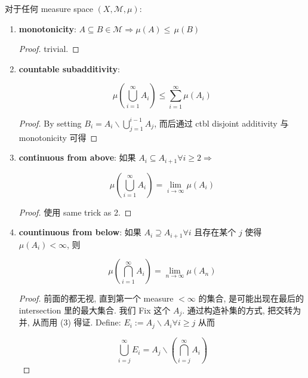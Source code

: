 \begin{theorem}{}

对于任何 measure space \((X,\mathcal{M},\mu)\):

\begin{enumerate}
\item
  \textbf{monotonicity}: \(A \subseteq B \in \mathcal{M}\Longrightarrow\mu(A) \leq \,\mu(B)\)

  \begin{proof}

  trivial.

  \end{proof}
\item
  \textbf{countable subadditivity}:

  \[\mu(\bigcup\limits_{i = 1}^{\infty}A_{i}) \leq \sum\limits_{i = 1}^{\infty}\mu(A_{i})\]

  \begin{proof}

  By setting \(B_{i} = A_{i}\backslash\bigcup_{j = 1}^{i - 1}A_{j}\), 而后通过 ctbl disjoint additivity 与 monotonicity 可得

  \end{proof}
\item
  \textbf{continuous from above}: 如果 \(A_{i} \subseteq A_{i + 1}\forall i \geq 2\Longrightarrow\)

  \[\mu(\bigcup\limits_{i = 1}^{\infty}A_{i}) = \lim\limits_{i\rightarrow\infty}\mu(A_{i})\]

  \begin{proof}

  使用 same trick as 2.

  \end{proof}
\item
  \textbf{countinuous from below}: 如果 \(A_{i} \supseteq A_{i + 1}\forall i\) 且存在某个 \(j\) 使得 \(\mu(A_{i}) < \infty\), 则

  \[\mu(\bigcap\limits_{i = 1}^{\infty}A_{i}) = \lim\limits_{n\rightarrow\infty}\mu(A_{n})\]

  \begin{proof}

  前面的都无视, 直到第一个 measure \(< \infty\) 的集合, 是可能出现在最后的 intersection 里的最大集合. 我们 Fix 这个 \(A_{j}\). 通过构造补集的方式, 把交转为并, 从而用 (3) 得证. Define: \(E_{i} := A_{j}\backslash A_{i}\forall i \geq j\) 从而

  \[\bigcup\limits_{i = j}^{\infty}E_{i} = A_{j}\backslash(\bigcap\limits_{i = j}^{\infty}A_{i})\]


\end{proof}
\end{enumerate}
\end{theorem}
